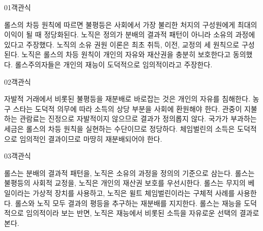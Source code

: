 \documentclass[fs85,seriesWit]{korfarm-base}
\begin{document}
\kfBeginMC
\begin{kfQBlock}{01}{객관식}
\begin{kfChoices}
\kfChoice 롤스의 차등 원칙에 따르면 불평등은 사회에서 가장 불리한 처지의 구성원에게 최대의 이익이 될 때 정당화된다.
\kfChoice 노직은 정의가 분배의 결과적 패턴이 아니라 소유의 과정에 있다고 주장했다.
\kfChoice 노직의 소유 권원 이론은 최초 취득, 이전, 교정의 세 원칙으로 구성된다.
\kfChoice 노직은 롤스의 차등 원칙이 개인의 자유와 재산권을 충분히 보호한다고 동의했다.
\kfChoice 롤스주의자들은 개인의 재능이 도덕적으로 임의적이라고 주장한다.
\end{kfChoices}
\end{kfQBlock}

\begin{kfQBlock}{02}{객관식}
\begin{kfChoices}
\kfChoice 자발적 거래에서 비롯된 불평등을 재분배로 바로잡는 것은 개인의 자유를 침해한다.
\kfChoice 농구 스타는 도덕적 의무에 따라 소득의 상당 부분을 사회에 환원해야 한다.
\kfChoice 관중이 지불하는 관람료는 진정으로 자발적이지 않으므로 결과가 정의롭지 않다.
\kfChoice 국가가 부과하는 세금은 롤스의 차등 원칙을 실현하는 수단이므로 정당하다.
\kfChoice 체임벌린의 소득은 도덕적으로 임의적인 결과이므로 마땅히 재분배되어야 한다.
\end{kfChoices}
\end{kfQBlock}

\begin{kfQBlock}{03}{객관식}
\begin{kfChoices}
\kfChoice 롤스는 분배의 결과적 패턴을, 노직은 소유의 과정을 정의의 기준으로 삼는다.
\kfChoice 롤스는 불평등의 사회적 교정을, 노직은 개인의 재산권 보호를 우선시한다.
\kfChoice 롤스는 무지의 베일이라는 가상적 장치를 사용하고, 노직은 윌트 체임벌린이라는 구체적 사례를 사용한다.
\kfChoice 롤스와 노직 모두 결과의 평등을 추구하는 재분배를 지지한다.
\kfChoice 롤스는 재능을 도덕적으로 임의적이라 보는 반면, 노직은 재능에서 비롯된 소득을 자유로운 선택의 결과로 본다.
\end{kfChoices}
\end{kfQBlock}
\end{document}
